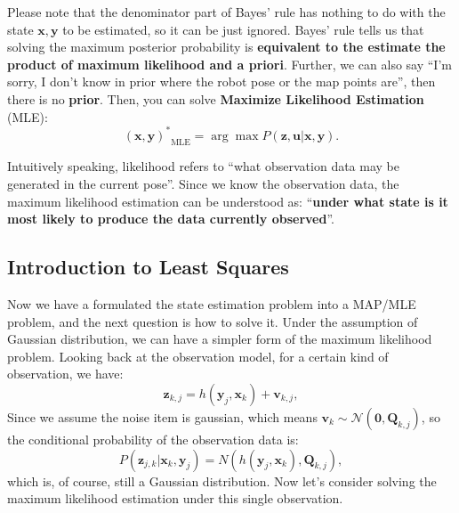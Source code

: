 Please note that the denominator part of Bayes' rule has nothing to do with the state $ \mathbf {x}, \mathbf {y} $ to be estimated, so it can be just ignored. Bayes' rule tells us that solving the maximum posterior probability is \textbf {equivalent to the estimate the product of maximum likelihood and a priori}. Further, we can also say ``I'm sorry, I don't know in prior where the robot pose or the map points are'', then there is no \textbf {prior}. Then, you can solve \textbf {Maximize Likelihood Estimation} (MLE):
\begin{equation}
{ (\mathbf{x},\mathbf{y})^*}_{\mathrm{MLE}} = \arg \max P( \mathbf{z},\mathbf{u}| \mathbf{x},\mathbf{y}).
\end{equation}

Intuitively speaking, likelihood refers to ``what observation data may be generated in the current pose''. Since we know the observation data, the maximum likelihood estimation can be understood as: ``\textbf{under what state is it most likely to produce the data currently observed}''. 

\subsection{Introduction to Least Squares}
Now we have a formulated the state estimation problem into a MAP/MLE problem, and the next question is how to solve it. Under the assumption of Gaussian distribution, we can have a simpler form of the maximum likelihood problem. Looking back at the observation model, for a certain kind of observation, we have:
\[
{\mathbf{z}_{k,j}} = h\left( {{ \mathbf{y}_j},{ \mathbf{x}_k}} \right)+ \mathbf{v}_{k, j},
\]
Since we assume the noise item is gaussian, which means ${\mathbf{v}_k} \sim \mathcal{N}\left( {\mathbf{0},{{{\mathbf{Q}}}_{k,j}}} \right)$, so the conditional probability of the observation data is:
\[
P( \mathbf{z}_{j,k} | \mathbf{x}_k, \mathbf{y}_j) = N\left( h(\mathbf{y}_j, \mathbf{x}_k), \mathbf{Q}_{k,j} \right),
\]
which is, of course, still a Gaussian distribution. Now let's consider solving the maximum likelihood estimation under this single observation.


